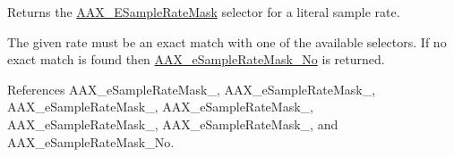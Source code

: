 Returns the \hyperlink{a00206_a5bb98259de21d2c4d04a2d6010d757c7}{A\+A\+X\+\_\+\+E\+Sample\+Rate\+Mask} selector for a literal sample rate. 

The given rate must be an exact match with one of the available selectors. If no exact match is found then \hyperlink{a00206_a5bb98259de21d2c4d04a2d6010d757c7a458fc436e77f902b77b7b983a851219f}{A\+A\+X\+\_\+e\+Sample\+Rate\+Mask\+\_\+\+No} is returned. 

References A\+A\+X\+\_\+e\+Sample\+Rate\+Mask\+\_, A\+A\+X\+\_\+e\+Sample\+Rate\+Mask\+\_, A\+A\+X\+\_\+e\+Sample\+Rate\+Mask\+\_, A\+A\+X\+\_\+e\+Sample\+Rate\+Mask\+\_, A\+A\+X\+\_\+e\+Sample\+Rate\+Mask\+\_, A\+A\+X\+\_\+e\+Sample\+Rate\+Mask\+\_, and A\+A\+X\+\_\+e\+Sample\+Rate\+Mask\+\_\+\+No.

